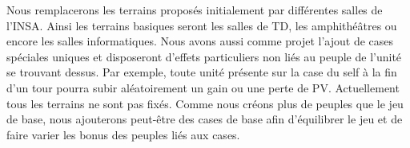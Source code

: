Nous remplacerons les terrains proposés initialement par différentes salles de l'INSA. Ainsi les terrains basiques seront les salles de TD, les amphithéâtres ou encore les salles informatiques. Nous avons aussi comme projet l'ajout de cases spéciales uniques et disposeront d'effets particuliers non liés au peuple de l'unité se trouvant dessus. Par exemple, toute unité présente sur la case du self à la fin d'un tour pourra subir aléatoirement un gain ou une perte de PV.
Actuellement tous les terrains ne sont pas fixés. Comme nous créons plus de peuples que le jeu de base, nous ajouterons peut-être des cases de base afin d'équilibrer le jeu et de faire varier les bonus des peuples liés aux cases.